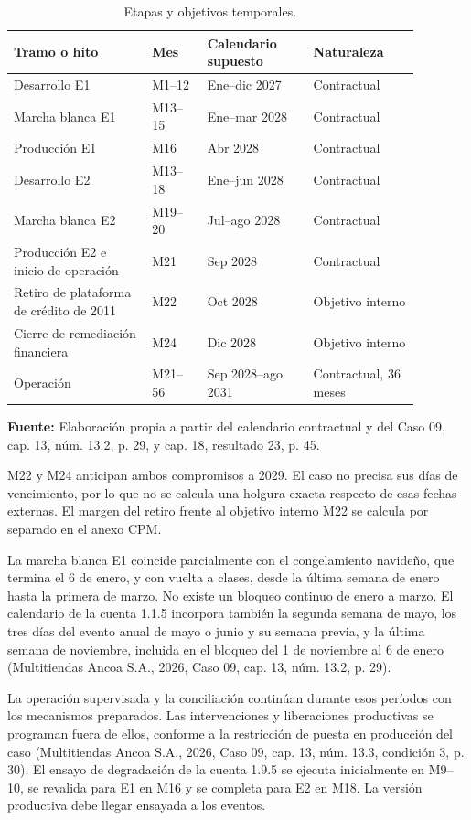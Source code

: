 \documentclass[11pt]{article}
\begin{document}
\begin{longtable}{p{0.30\linewidth}p{0.12\linewidth}p{0.23\linewidth}p{0.23\linewidth}}
\caption{Etapas y objetivos temporales.}\label{tab:7-4}\\
\toprule\noalign{}
\textbf{Tramo o hito} & \textbf{Mes} & \textbf{Calendario supuesto} & \textbf{Naturaleza} \\
\midrule
\endhead
\bottomrule
\endlastfoot
Desarrollo E1 & M1--12 & Ene--dic 2027 & Contractual \\
Marcha blanca E1 & M13--15 & Ene--mar 2028 & Contractual \\
Producción E1 & M16 & Abr 2028 & Contractual \\
Desarrollo E2 & M13--18 & Ene--jun 2028 & Contractual \\
Marcha blanca E2 & M19--20 & Jul--ago 2028 & Contractual \\
Producción E2 e inicio de operación & M21 & Sep 2028 & Contractual \\
Retiro de plataforma de crédito de 2011 & M22 & Oct 2028 & Objetivo interno \\
Cierre de remediación financiera & M24 & Dic 2028 & Objetivo interno \\
Operación & M21--56 & Sep 2028--ago 2031 & Contractual, 36 meses \\
\end{longtable}
\textbf{Fuente:} Elaboración propia a partir del calendario contractual y del Caso 09, cap. 13, núm. 13.2, p. 29, y cap. 18, resultado 23, p. 45.

M22 y M24 anticipan ambos compromisos a 2029. El caso no precisa sus días de vencimiento, por lo que no se calcula una holgura exacta respecto de esas fechas externas. El margen del retiro frente al objetivo interno M22 se calcula por separado en el anexo CPM.

La marcha blanca E1 coincide parcialmente con el congelamiento navideño, que termina el 6 de enero, y con vuelta a clases, desde la última semana de enero hasta la primera de marzo. No existe un bloqueo continuo de enero a marzo. El calendario de la cuenta 1.1.5 incorpora también la segunda semana de mayo, los tres días del evento anual de mayo o junio y su semana previa, y la última semana de noviembre, incluida en el bloqueo del 1 de noviembre al 6 de enero (Multitiendas Ancoa S.A., 2026, Caso 09, cap. 13, núm. 13.2, p. 29).

La operación supervisada y la conciliación continúan durante esos períodos con los mecanismos preparados. Las intervenciones y liberaciones productivas se programan fuera de ellos, conforme a la restricción de puesta en producción del caso (Multitiendas Ancoa S.A., 2026, Caso 09, cap. 13, núm. 13.3, condición 3, p. 30). El ensayo de degradación de la cuenta 1.9.5 se ejecuta inicialmente en M9--10, se revalida para E1 en M16 y se completa para E2 en M18. La versión productiva debe llegar ensayada a los eventos.
\end{document}
